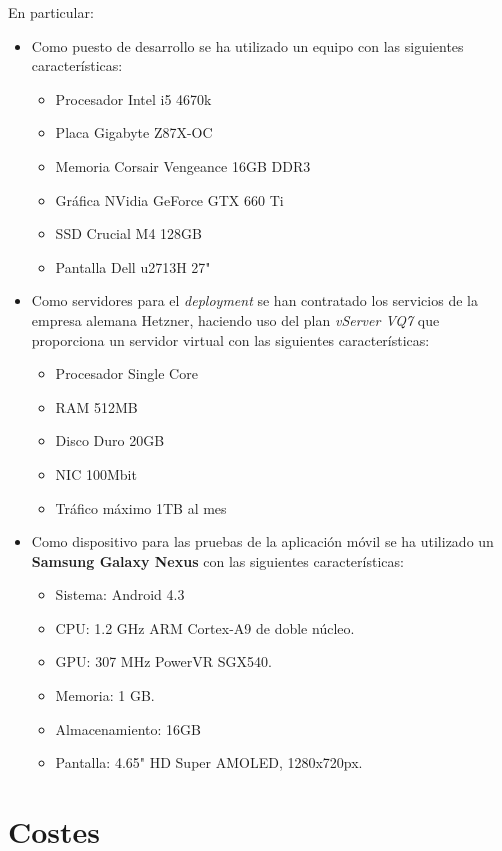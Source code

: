 En particular:
\begin{itemize}
\item Como puesto de desarrollo se ha utilizado un equipo con las siguientes características:
  \begin{itemize}
  \item Procesador Intel i5 4670k
  \item Placa Gigabyte Z87X-OC
  \item Memoria Corsair Vengeance 16GB DDR3
  \item Gráfica NVidia GeForce GTX 660 Ti
  \item SSD Crucial M4 128GB
  \item Pantalla Dell u2713H 27"
  \end{itemize}

\item Como servidores para el \textit{deployment} se han contratado los
  servicios de la empresa alemana Hetzner, haciendo uso del plan \textit{vServer
    VQ7} que proporciona un servidor virtual con las siguientes características:
  \begin{itemize}
  \item Procesador Single Core
  \item RAM 512MB
  \item Disco Duro 20GB
  \item NIC 100Mbit
  \item Tráfico máximo 1TB al mes
  \end{itemize}

\item Como dispositivo para las pruebas de la aplicación móvil se ha utilizado
  un \textbf{Samsung Galaxy Nexus} con las siguientes características:

  \begin{itemize}
  \item Sistema: Android 4.3
  \item CPU: 1.2 GHz ARM Cortex-A9 de doble núcleo.
  \item GPU: 307 MHz PowerVR SGX540.
  \item Memoria: 1 GB.
  \item Almacenamiento: 16GB
  \item Pantalla: 4.65" HD Super AMOLED, 1280x720px.
  \end{itemize}

\end{itemize}

\section{Costes}

